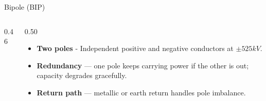 \begin{frame}{Bipole (BIP)}
  \begin{columns}[c,onlytextwidth]
    \begin{column}{0.46\textwidth}
      \centering
    \end{column}
    \begin{column}{0.50\textwidth}
      \vspace{0.5em}
      \begin{itemize}
        \setlength{\itemsep}{0.7em}
        \item \textbf{Two poles} - Independent positive and negative
              conductors at $\pm525kV$.
        \item \textbf{Redundancy} --- one pole keeps carrying power if the
              other is out; capacity degrades gracefully.
        \item \textbf{Return path} --- metallic or earth return handles
              pole imbalance.
      \end{itemize}
    \end{column}
  \end{columns}
\end{frame}
